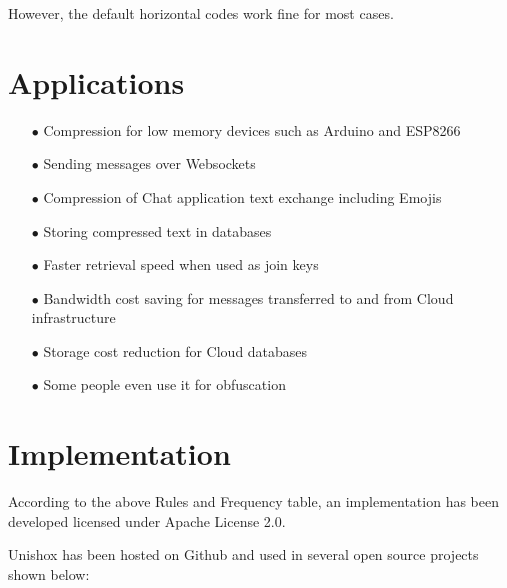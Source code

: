 \documentclass[]{article}
\begin{document}
	However, the default horizontal codes work fine for most cases.
	
	\section{Applications}
	
	\begin{itemize}
		\item[$\bullet$] Compression for low memory devices such as Arduino and ESP8266
		\item[$\bullet$] Sending messages over Websockets
		\item[$\bullet$] Compression of Chat application text exchange including Emojis
		\item[$\bullet$] Storing compressed text in databases
		\item[$\bullet$] Faster retrieval speed when used as join keys
		\item[$\bullet$] Bandwidth cost saving for messages transferred to and from Cloud infrastructure
		\item[$\bullet$] Storage cost reduction for Cloud databases
		\item[$\bullet$] Some people even use it for obfuscation
	\end{itemize}
	
	\section{Implementation}
	
	According to the above Rules and Frequency table, an implementation has been developed licensed under Apache License 2.0.
	
	Unishox has been hosted on Github and used in several open source projects shown below:
	
\end{document}
